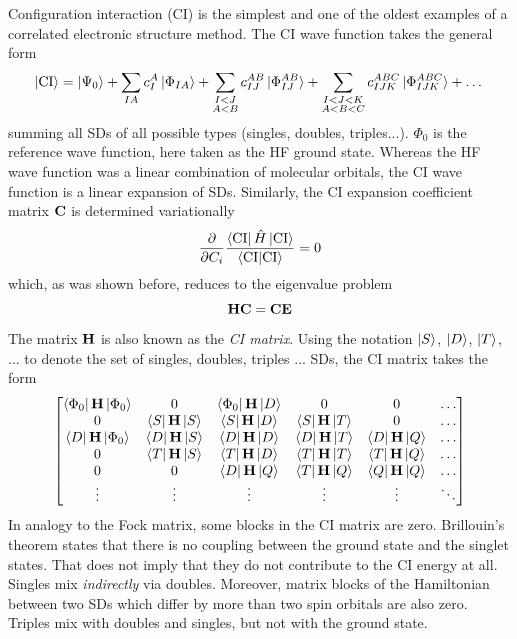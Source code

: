 Configuration interaction (CI) is the simplest and one of the oldest examples of a correlated electronic structure method. The CI wave function takes the general form
\begin{equation}
\ket{\text{CI}} = \ket{\smash{\Psi_0}} + \sum_{IA} c_{I}^{A} \ket{\smash{\Phi_{IA}}} + \sum_{\substack{I < J \\ A < B}} c_{IJ}^{AB} \ket{\smash{\Phi_{IJ}^{AB}}} + \sum_{\substack{I < J < K \\ A < B < C}} c_{IJK}^{ABC} \ket{\smash{\Phi_{IJK}^{ABC}}} + \dots
\end{equation}
\noindent summing all SDs of all possible types (singles, doubles, triples...). $\Phi_0$ is the reference wave function, here taken as the HF ground state. Whereas the HF wave function was a linear combination of molecular orbitals, the CI wave function is a linear expansion of SDs. Similarly, the CI expansion coefficient matrix $\mathbf{C}$ is determined variationally
\begin{equation}
\frac{\partial}{\partial C_i} \frac{\bra{\smash{\text{CI}}}\hat{H}\ket{\smash{\text{CI}}}}{\bra{\smash{\text{CI}}}\ket{\smash{\text{CI}}}} = 0
\end{equation}
\noindent which, as was shown before, reduces to the eigenvalue problem
\begin{equation}
\mathbf{H}\mathbf{C} = \mathbf{C}\mathbf{E}
\end{equation}
\noindent The matrix $\mathbf{H}$ is also known as the \emph{CI matrix}. Using the notation $\ket{S}$, $\ket{D}$, $\ket{T}$, ... to denote the set of singles, doubles, triples ... SDs, the CI matrix takes the form
\begin{equation}
\begin{bmatrix}
\bra{\Phi_0}\mathbf{H}\ket{\Phi_0} & 0 & \bra{\Phi_0}\mathbf{H}\ket{D} & 0 & 0 & \ldots \\
0 & \bra{S}\mathbf{H}\ket{S} & \bra{S}\mathbf{H}\ket{D} & \bra{S}\mathbf{H}\ket{T} & 0 & \ldots \\
\bra{D}\mathbf{H}\ket{\Phi_0} & \bra{D}\mathbf{H}\ket{S} & \bra{D}\mathbf{H}\ket{D} & \bra{D}\mathbf{H}\ket{T} & \bra{D}\mathbf{H}\ket{Q} & \ldots \\
0 & \bra{T}\mathbf{H}\ket{S} & \bra{T}\mathbf{H}\ket{D} & \bra{T}\mathbf{H}\ket{T} & \bra{T}\mathbf{H}\ket{Q} & \ldots \\
0 & 0 & \bra{D}\mathbf{H}\ket{Q} & \bra{T}\mathbf{H}\ket{Q} & \bra{Q}\mathbf{H}\ket{Q} & \ldots \\
\vdots & \vdots & \vdots & \vdots & \vdots & \ddots  
\end{bmatrix}
\end{equation}
\noindent In analogy to the Fock matrix, some blocks in the CI matrix are zero. Brillouin's theorem states that there is no coupling between the ground state and the singlet states. That does not imply that they do not contribute to the CI energy at all. Singles mix \emph{indirectly} via doubles. Moreover, matrix blocks of the Hamiltonian between two SDs which differ by more than two spin orbitals are also zero. Triples mix with doubles and singles, but not with the ground state.

